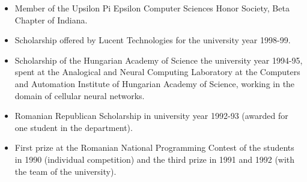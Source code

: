 \begin{itemize}[nosep, noitemsep]
    \item Member of the Upsilon Pi Epsilon Computer Sciences Honor Society, Beta Chapter of Indiana.
    
    \item Scholarship offered by Lucent Technologies for the university year 1998-99.
    
    \item Scholarship of the Hungarian Academy of Science the university year 1994-95, spent at the Analogical and Neural Computing Laboratory at the Computers and Automation Institute of Hungarian Academy of Science, working in the domain of cellular neural networks.
    
    \item Romanian Republican Scholarship in university year 1992-93 (awarded for one student in the department).
    
    \item First prize at the Romanian National Programming Contest of the students in 1990 (individual competition) and the third prize in  1991 and 1992 (with the team of the university).
    
\end{itemize}
